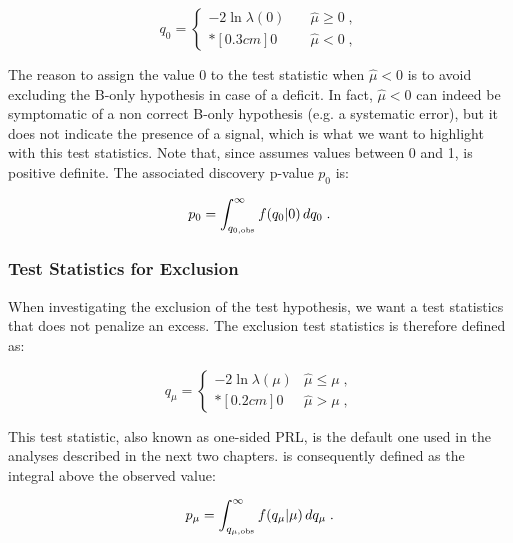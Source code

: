 \begin{equation}
\label{eq:stat:q0}
q_{0} =
\left\{ \! \! \begin{array}{ll}
               - 2 \ln \lambda(0)
               & \quad \hat{\mu} \ge 0 \;, \\*[0.3 cm]
               0 & \quad \hat{\mu} < 0  \;,
              \end{array}
       \right.
\end{equation}
 
\noindent The reason to assign the value 0 to the test statistic when $\hat{\mu} < 0$ is to avoid excluding the B-only hypothesis in case of a deficit. In fact, $\hat{\mu} < 0$ can indeed be symptomatic of a non correct B-only hypothesis (e.g. a systematic error), but it does not indicate the presence of a signal, which is what we want to highlight with this test statistics. Note that, since \prl assumes values between 0 and 1, \qzero is positive definite. The associated discovery p-value $p_{0}$ is:

\begin{equation}
\label{eq:stat:p0}
p_{0} = \int_{q_{0,{\rm obs}}}^{\infty} f(q_{0} | 0 ) \, d q_{0} \;.
\end{equation}

\subsubsection*{Test Statistics for Exclusion}

When investigating the exclusion of the test hypothesis, we want a test statistics that does not penalize an excess. The exclusion test statistics \qmu is therefore defined as:

\begin{equation}
\label{eq:stat:qmu}
q_{\mu} =
\left\{ \! \! \begin{array}{ll}
               - 2 \ln \lambda(\mu)  & \hat{\mu} \le \mu  \;, \\*[0.2 cm]
               0 & \hat{\mu} > \mu \;,
              \end{array}
       \right.
\end{equation}

\noindent This test statistic, also known as one-sided PRL, is the default one used in the analyses described in the next two chapters. \pmu is consequently defined as the integral above the observed value: 

\begin{equation}
\label{eq:stat:pmu}
p_{\mu} = \int_{q_{\mu,{\rm obs}}}^{\infty} f(q_{\mu} | \mu ) \, d q_{\mu} \;.
\end{equation}

